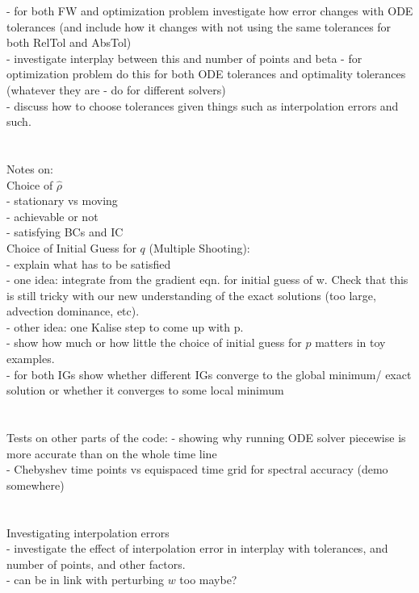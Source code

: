 \documentclass[11pt, a4paper]{article}
\theoremstyle{definition}
\newcommand{\adj}{q}
\begin{document}
- for both FW and optimization problem investigate how error changes with ODE tolerances (and include how it changes with not using the same tolerances for both RelTol and AbsTol)\\
- investigate interplay between this and number of points and beta
- for optimization problem do this for both ODE tolerances and optimality tolerances (whatever they are - do for different solvers)\\
- discuss how to choose tolerances given things such as interpolation errors and such.\\
\\
\\
Notes on:\\
Choice of $\hat \rho$\\
- stationary vs moving\\
- achievable or not\\
- satisfying BCs and IC\\
Choice of Initial Guess for $\adj$ (Multiple Shooting):\\
- explain what has to be satisfied\\
- one idea: integrate from the gradient eqn. for initial guess of w. Check that this is still tricky with our new understanding of the exact solutions (too large, advection dominance, etc). \\
- other idea: one Kalise step to come up with p.\\
- show how much or how little the choice of initial guess for $p$ matters in toy examples.\\
- for both IGs show whether different IGs converge to the global minimum/ exact solution or whether it converges to some local minimum\\
\\
\\
Tests on other parts of the code:
- showing why running ODE solver piecewise is more accurate than on the whole time line\\
- Chebyshev time points vs equispaced time grid for spectral accuracy (demo somewhere)\\
\\
\\
Investigating interpolation errors\\
- investigate the effect of interpolation error in interplay with tolerances, and number of points, and other factors.\\
- can be in link with perturbing $w$ too maybe?
\end{document}
